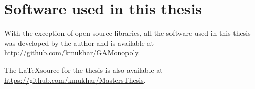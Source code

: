 \clearpage
\newpage
\chapter{Software used in this thesis}
\label{appendix:software}

With the exception of open source libraries, all the software used in this
thesis was developed by the author and is available at
\url{http://github.com/kmukhar/GAMonopoly}.

The \LaTeX source for the thesis is also available at
\url{https://github.com/kmukhar/MastersThesis}.
